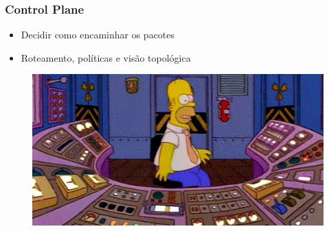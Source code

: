 %
%
\begin{frame}\frametitle{Control Plane}

    \begin{itemize}
    \item Decidir como encaminhar os pacotes
    \item Roteamento, políticas e visão topológica
    \end{itemize}
    	\begin{figure}[h]
        \centering
        \includegraphics[scale=0.5]{images/control-plane.png}
    \end{figure}
\end{frame}


